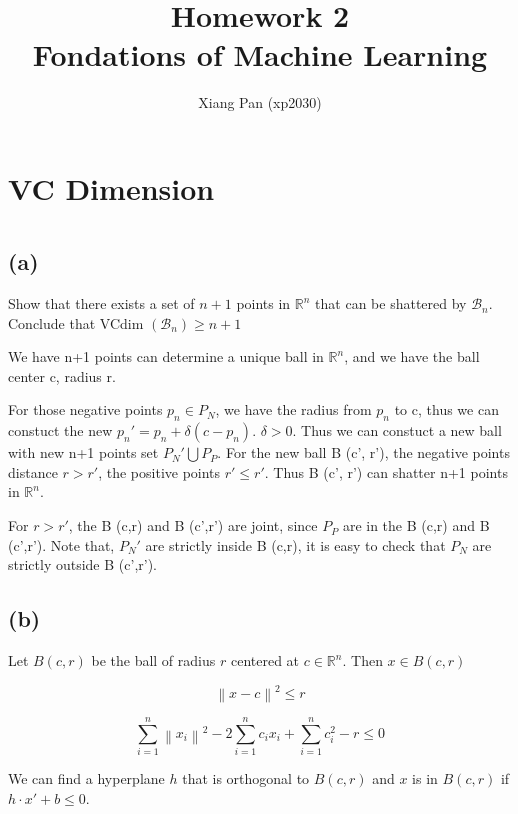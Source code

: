 \documentclass{article}
\title{%
   Homework 2 \\
  \large Fondations of Machine Learning \\}
\author{Xiang Pan (xp2030)}
\begin{document}
\maketitle
\section*{VC Dimension}
\section{}
\subsection*{(a)}
Show that there exists a set of $n+1$ points in $\mathbb{R}^{n}$ that can be shattered by $\mathcal{B}_{n}$. Conclude that VCdim $\left(\mathcal{B}_{n}\right) \geq n+1$


We have n+1 points can determine a unique ball in $\mathbb{R}^{n}$, and we have the ball center c, radius r.

For those negative points $p_n \in P_{N}$, we have the radius from $p_n$ to c, thus we can constuct the new $p_n' = p_n + \delta(c-p_n)$.
$\delta>0$. Thus we can constuct a new ball with new n+1 points set ${P_N'} \bigcup {P_P}$. For the new ball B (c', r'), the negative points distance $r>r'$, the positive points $r'\leq r'$. Thus B (c', r') can shatter n+1 points in $\mathbb{R}^{n}$.

For $r > r'$, the B (c,r) and B (c',r') are joint, since $P_P$ are in the B (c,r) and B (c',r'). Note that, $P_N'$ are strictly inside B (c,r), it is easy to check that $P_N$ are strictly outside B (c',r').

\subsection*{(b)}

Let $B(c, r)$ be the ball of radius $r$ centered at $c \in \mathbb{R}^{n}$. Then $x \in B(c, r)$

\begin{equation}
    \left\| x - c \right\|^2 \leq r
\end{equation}


\begin{equation}
    \sum_{i=1}^{n}\left\|x_{i}\right\|^{2}-2 \sum_{i=1}^{n} c_{i} x_{i}+\sum_{i=1}^{n} c_{i}^{2}-r \leq 0
\end{equation}

We can find a hyperplane $h$ that is orthogonal to $B(c, r)$ and $x$ is in $B(c, r)$ if $h \cdot x' + b \leq 0$.
\end{document}

